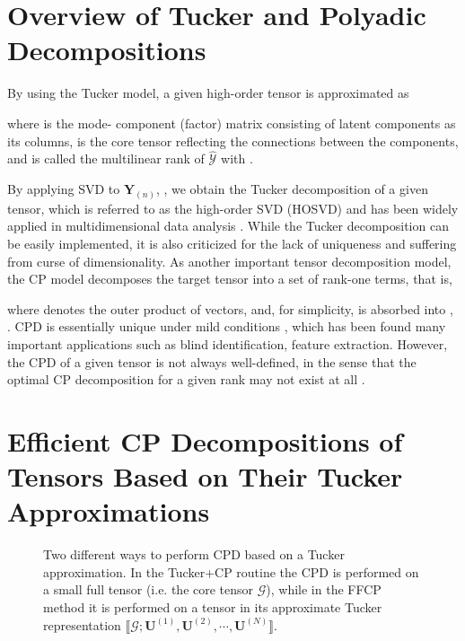 \documentclass[10pt,twocolumn,twoside]{IEEEtran}
\newcommand{\tensor}[1]{\ensuremath{\boldsymbol{\mathscr{#1}}}}
\newcommand{\tenmat}[2][n]{\ensuremath{{\mathbf{#2}}_{(#1)}}}
\newcommand{\compactTucker}[2]{\ensuremath{\llbracket \tensor{#1}; {\mathbf{#2}}^{(1)}, {\mathbf{#2}}^{(2)}, \cdots, {\mathbf{#2}}^{(N)}\rrbracket}}
\begin{document}
\section{Overview of Tucker and Polyadic Decompositions}
\label{sec:Models}
By using the Tucker model, a given high-order tensor  is approximated as

where  is the mode- component (factor) matrix consisting of latent components  as its columns,   is the core tensor reflecting the connections between the components, and   is called the multilinear rank of \tensor{\hat{Y}} with . 

By applying SVD to \tenmat{Y}, , we obtain the Tucker decomposition of a given tensor, which is referred to as the high-order SVD (HOSVD) and has been widely applied in multidimensional data analysis \cite{tensorFaces,HOgraphMatch,DenoisingHOSVD2013}. While the Tucker decomposition can be easily implemented, it is also criticized for the lack of uniqueness and suffering from curse of dimensionality. As another important tensor decomposition model, the CP model decomposes the target tensor into a set of rank-one terms, that is,

where  denotes the outer product of vectors, 
and, for simplicity,  is absorbed into , .
CPD is essentially unique under mild conditions \cite{Sidiropoulos2000}, which has been found many important applications such as blind identification, feature extraction. However, the CPD of a given tensor is not always well-defined, in the sense that the optimal CP decomposition for a given rank may not exist at all \cite{deSilva:2008:ill-posted}.

\section{Efficient CP Decompositions of Tensors Based on Their Tucker Approximations}
\label{sec:TPD}


 \begin{figure*}[!t]
\centerline{
  \;
}
\caption{Two different ways to perform CPD based on a Tucker approximation. In the Tucker+CP routine the CPD is performed on a small full tensor (i.e. the core tensor \tensor{G}), while in the FFCP method it is performed on a tensor in its approximate Tucker representation \compactTucker{G}{U}.}
\label{fig:TuckerCP}
\end{figure*}
\end{document}
